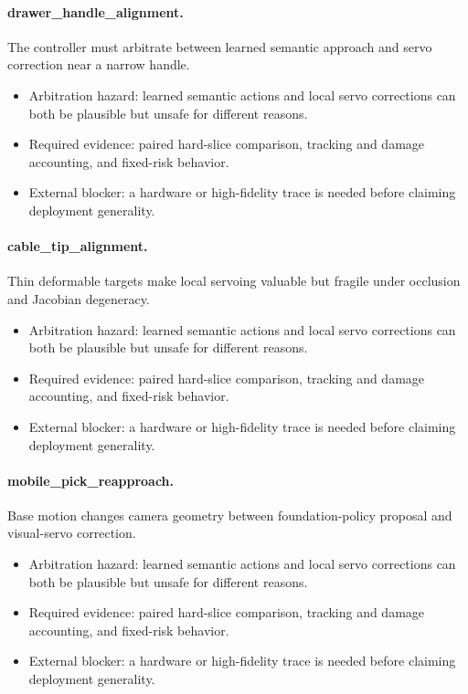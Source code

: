 \documentclass{article}
\begin{document}
\paragraph{drawer\_handle\_alignment.} The controller must arbitrate between learned semantic approach and servo correction near a narrow handle.
\begin{itemize}
\item Arbitration hazard: learned semantic actions and local servo corrections can both be plausible but unsafe for different reasons.
\item Required evidence: paired hard-slice comparison, tracking and damage accounting, and fixed-risk behavior.
\item External blocker: a hardware or high-fidelity trace is needed before claiming deployment generality.
\end{itemize}
\paragraph{cable\_tip\_alignment.} Thin deformable targets make local servoing valuable but fragile under occlusion and Jacobian degeneracy.
\begin{itemize}
\item Arbitration hazard: learned semantic actions and local servo corrections can both be plausible but unsafe for different reasons.
\item Required evidence: paired hard-slice comparison, tracking and damage accounting, and fixed-risk behavior.
\item External blocker: a hardware or high-fidelity trace is needed before claiming deployment generality.
\end{itemize}
\paragraph{mobile\_pick\_reapproach.} Base motion changes camera geometry between foundation-policy proposal and visual-servo correction.
\begin{itemize}
\item Arbitration hazard: learned semantic actions and local servo corrections can both be plausible but unsafe for different reasons.
\item Required evidence: paired hard-slice comparison, tracking and damage accounting, and fixed-risk behavior.
\item External blocker: a hardware or high-fidelity trace is needed before claiming deployment generality.
\end{itemize}
\clearpage
\end{document}
